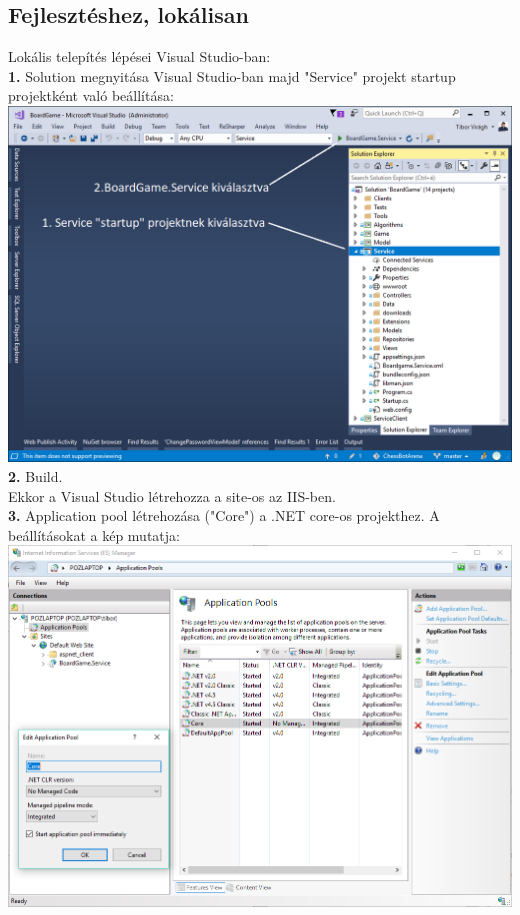 \documentclass[twoside, a4paper, 12pt]{book}
\begin{document}
\subsection{Fejlesztéshez, lokálisan}
\noindent Lokális telepítés lépései Visual Studio-ban: \\
\noindent \textbf{1.} Solution megnyitása Visual Studio-ban majd "Service" projekt startup projektként való beállítása: \\
\includegraphics[width=1.0\textwidth]{img/server_dev_run_1.png} \\

\noindent \textbf{2.} Build. \\
Ekkor a Visual Studio létrehozza a site-os az IIS-ben. \\

\noindent \textbf{3.} Application pool létrehozása ("Core") a .NET core-os projekthez. A beállításokat a kép mutatja: \\
\includegraphics[width=1.0\textwidth]{img/server_dev_run_2.png} \\
\end{document}
